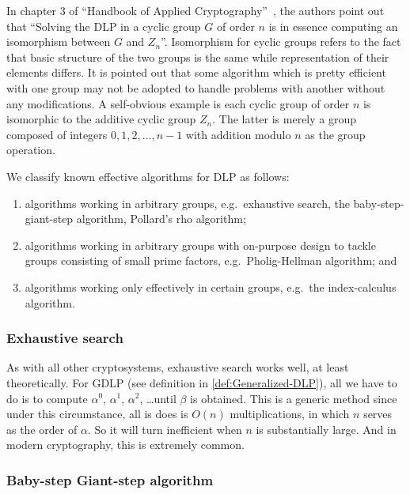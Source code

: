 \documentclass[12pt,journal,compsoc]{IEEEtran}
\begin{document}
In chapter 3 of ``Handbook of Applied
Cryptography''~\cite{ref:menezes2010handbook}, the authors point out
that ``Solving the DLP in a cyclic group $G$ of order $n$ is in
essence computing an isomorphism between $G$ and
$Z_{n}$''. Isomorphism for cyclic groups refers to the fact that basic
structure of the two groups is the same while representation of their
elements differs. It is pointed out that some algorithm which is
pretty efficient with one group may not be adopted to handle problems
with another without any modifications. A self-obvious example is each
cyclic group of order $n$ is isomorphic to the additive cyclic group
$Z_{n}$. The latter is merely a group composed of integers
${0,1,2,\ldots,n-1}$ with addition modulo $n$ as the group operation.
\par
We classify known effective algorithms for DLP as follows:
\begin{enumerate}
\item algorithms working in arbitrary groups, e.g.\ exhaustive search,
  the baby-step-giant-step algorithm, Pollard's rho algorithm;
\item algorithms working in arbitrary groups with on-purpose design to
  tackle groups consisting of small prime factors, e.g.\
  Pholig-Hellman algorithm; and
\item algorithms working only effectively in certain groups, e.g.\ the
  index-calculus algorithm.
\end{enumerate}



\subsubsection{\qquad Exhaustive search}
\label{sec:exhaustive-search}
As with all other cryptosystems, exhaustive search works well, at
least theoretically. For GDLP (see definition in
\ref{def:Generalized-DLP}), all we have to do is to compute 
$\alpha^{0}$, $\alpha^{1}$, $\alpha^{2}$, \ldots until $\beta$ is
obtained. This is a generic method since under this circumstance, all
is does is $O(n)$ multiplications, in which $n$ serves as the order of
$\alpha$. So it will turn inefficient when $n$ is substantially
large. And in modern cryptography, this is extremely common.

\subsubsection{\qquad Baby-step Giant-step algorithm}
\label{sec:baby-step-giant}
\end{document}
